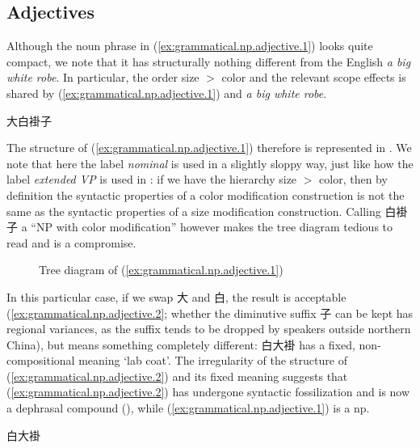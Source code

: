 \documentclass[UTF8, a4paper, oneside, scheme=plain, 12pt]{ctexrep}
\newcommand*{\textgt}{$>$ }
\newcommand*{\term}[1]{\emph{#1}}
\newcommand{\form}[1]{\emph{#1}}
\newcommand{\translate}[1]{`#1'}
\begin{document}
\subsection{Adjectives}\label{sec:grammatical.np.adjectives}

Although the noun phrase in (\ref{ex:grammatical.np.adjective.1}) looks quite compact,
we note that it has structurally nothing different from the English \form{a big white robe}.
In particular, the order size \textgt{}color and the relevant scope effects is shared
by (\ref{ex:grammatical.np.adjective.1}) and \form{a big white robe}.

\begin{exe}
    \ex\label{ex:grammatical.np.adjective.1} 大白褂子
\end{exe}

The structure of (\ref{ex:grammatical.np.adjective.1}) therefore is represented in 
.
We note that here the label \term{nominal} is used in a slightly sloppy way,
just like how the label \term{extended VP} is used in :
if we have the hierarchy size \textgt{}color,
then by definition the syntactic properties of a color modification construction
is not the same as the syntactic properties of a size modification construction.
Calling 白褂子 a ``NP with color modification'' however makes the tree diagram tedious to read
and  is a compromise.

\begin{figure}[H]
    \centering
    {
        \small
        
    }
    \caption{Tree diagram of (\ref{ex:grammatical.np.adjective.1})}
    \label{fig:grammatical.np.adjective.1}
\end{figure}

In this particular case, 
if we swap 大 and 白, the result is acceptable (\ref{ex:grammatical.np.adjective.2};
whether the diminutive suffix 子 can be kept has regional variances,
as the suffix tends to be dropped by speakers outside northern China),
but means something completely different:
白大褂 has a fixed, non-compositional meaning \translate{lab coat}.
The irregularity of the structure of (\ref{ex:grammatical.np.adjective.2})
and its fixed meaning suggests that (\ref{ex:grammatical.np.adjective.2}) has undergone syntactic fossilization
and is now a dephrasal compound (),
while (\ref{ex:grammatical.np.adjective.1}) is a \ac{np}.

\begin{exe}
    \ex\label{ex:grammatical.np.adjective.2} 白大褂
\end{exe}
\end{document}

